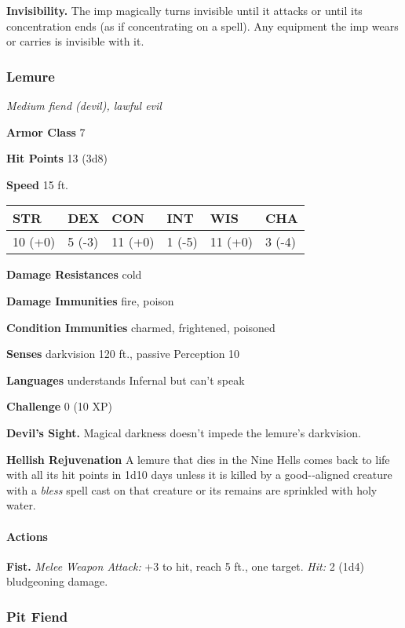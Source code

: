 \documentclass[
]{article}
\begin{document}
\textbf{Invisibility.} The imp magically turns invisible until it
attacks or until its concentration ends (as if concentrating on a
spell). Any equipment the imp wears or carries is invisible with it.

\hypertarget{lemure}{%
\subsubsection{Lemure}\label{lemure}}

\emph{Medium fiend (devil), lawful evil}

\textbf{Armor Class} 7

\textbf{Hit Points} 13 (3d8)

\textbf{Speed} 15 ft.

\begin{longtable}[]{@{}llllll@{}}
\toprule
STR & DEX & CON & INT & WIS & CHA\tabularnewline
\midrule
\endhead
10 (+0) & 5 (-3) & 11 (+0) & 1 (-5) & 11 (+0) & 3 (-4)\tabularnewline
\bottomrule
\end{longtable}

\textbf{Damage Resistances} cold

\textbf{Damage Immunities} fire, poison

\textbf{Condition Immunities} charmed, frightened, poisoned

\textbf{Senses} darkvision 120 ft., passive Perception 10

\textbf{Languages} understands Infernal but can't speak

\textbf{Challenge} 0 (10 XP)

\textbf{Devil's Sight.} Magical darkness doesn't impede the lemure's
darkvision.

\textbf{Hellish Rejuvenation} A lemure that dies in the Nine Hells comes
back to life with all its hit points in 1d10 days unless it is killed by
a good-­‐aligned creature with a \emph{bless} spell cast on that
creature or its remains are sprinkled with holy water.

\hypertarget{actions-17}{%
\paragraph{Actions}\label{actions-17}}

\textbf{Fist.} \emph{Melee Weapon Attack:} +3 to hit, reach 5 ft., one
target. \emph{Hit:} 2 (1d4) bludgeoning damage.

\hypertarget{pit-fiend}{%
\subsubsection{Pit Fiend}\label{pit-fiend}}
\end{document}
